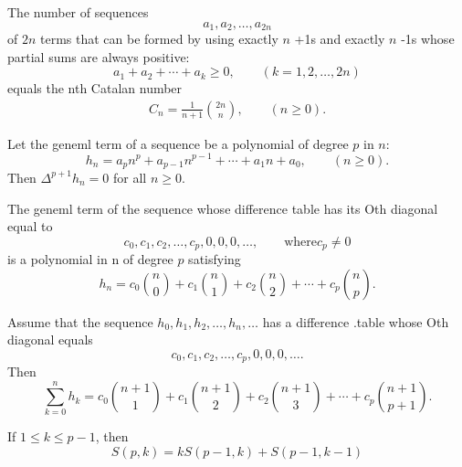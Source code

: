 \begin{theorem}
  \label{thm:8.1.1}
  The number of sequences 
  \begin{equation}\label{8.1}
  a_1, a_2, \ldots, a_{2n}
  \end{equation}
  of $2n$ terms that can be formed by using exactly $n$ +1s and exactly $n$ -1s whose partial sums 
  are always positive:
  \begin{equation}\label{8.2}
  a_1 + a_2 + \cdots + a_{k} \geq 0, \qquad  (k = 1, 2, \ldots, 2n)
  \end{equation}
  equals the nth Catalan number
  \begin{align*}
  C_n = \frac{1}{n+1} \binom{2n}{n}, \qquad (n \geq 0).
  \end{align*}
\end{theorem}

\begin{theorem}
  \label{thm:8.2.1}
  Let the geneml term of a sequence be a polynomial of degree $p$ in $n$:
  \[ h_n = a_pn^p + a_{p-1}n^{p-1} + \cdots + a_1n + a_0, \qquad (n \geq 0). \]
  Then $\Delta^{p+1}h_n = 0$ for all $n \geq 0$.
\end{theorem}

\begin{theorem}
  \label{thm:8.2.2}
  The geneml term of the sequence whose difference table has its Oth diagonal equal to
  \[ c_0, c_1, c_2, \ldots, c_p, 0, 0, 0, \ldots, \qquad \text{where} c_p \neq 0  \]
  is a polynomial in n of degree $p$ satisfying
  \begin{equation}\label{8.12}
    h_n = c_0\binom{n}{0} + c_1\binom{n}{1} + c_2\binom{n}{2} + \cdots + c_p\binom{n}{p}.
  \end{equation}
\end{theorem}

\begin{theorem}
  \label{thm:8.2.3}
  Assume that the sequence $h_0, h_1, h_2, \ldots, h_n, \ldots$ has a difference .table whose Oth 
  diagonal equals
  \[ c_0, c_1, c_2, \ldots, c_p, 0, 0, 0, \ldots. \]
  Then
  \begin{equation}
    \sum\limits_{k = 0}^{n}h_k = c_0\binom{n+1}{1} + c_1\binom{n+1}{2} + c_2\binom{n+1}{3} + \cdots 
    + c_p\binom{n+1}{p+1}.
  \end{equation}
\end{theorem}

\begin{theorem}
  \label{thm:8.2.4}
  If $1 \leq k \leq p- 1$, then
  \[ S(p, k) = kS(p-1, k) + S(p-1, k-1) \]
\end{theorem}


